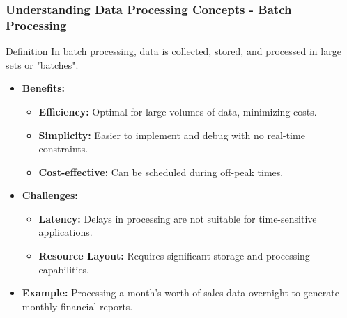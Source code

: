 \documentclass{beamer}
\begin{document}
\begin{frame}[fragile]
    \frametitle{Understanding Data Processing Concepts - Batch Processing}
    \begin{block}{Definition}
        In batch processing, data is collected, stored, and processed in large sets or "batches".
    \end{block}

    \begin{itemize}
        \item \textbf{Benefits:}
        \begin{itemize}
            \item \textbf{Efficiency:} Optimal for large volumes of data, minimizing costs.
            \item \textbf{Simplicity:} Easier to implement and debug with no real-time constraints.
            \item \textbf{Cost-effective:} Can be scheduled during off-peak times.
        \end{itemize}
        
        \item \textbf{Challenges:}
        \begin{itemize}
            \item \textbf{Latency:} Delays in processing are not suitable for time-sensitive applications.
            \item \textbf{Resource Layout:} Requires significant storage and processing capabilities.
        \end{itemize}
        
        \item \textbf{Example:} Processing a month's worth of sales data overnight to generate monthly financial reports.
    \end{itemize}
\end{frame}
\end{document}
